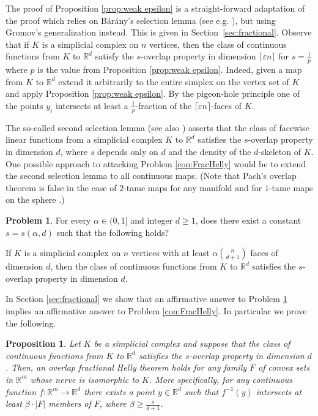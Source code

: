 \documentclass[12pt,a4paper,oneside]{amsart}\sloppy
\newtheorem{prop}[theorem]{Proposition}
\theoremstyle{definition}
\newtheorem{problem}[theorem]{Problem}
\begin{document}
The proof of Proposition \ref{prop:weak epsilon} is a straight-forward adaptation of the proof which relies on B{\'a}r{\'a}ny's selection lemma (see e.g. \cite[Theorem 9.2.1]{Matousek2002}), but using Gromov's generalization instead. This is given in Section~\ref{sec:fractional}. Observe that if $K$ is a simplicial complex on $n$ vertices, then the class of continuous functions from $K$ to $\mathbb{R}^d$ satisfy the $s$-overlap property in dimension $\lceil \varepsilon n \rceil$ for $s = \frac{1}{p}$ where $p$ is the value from Proposition \ref{prop:weak epsilon}. Indeed, given a map from $K$ to $\mathbb{R}^d$ extend it arbitrarily to the entire simplex on the vertex set of $K$ and apply Proposition \ref{prop:weak epsilon}. By the pigeon-hole principle one of the points $y_i$ intersects at least a $\frac{1}{p}$-fraction of the $\lceil \varepsilon n \rceil$-faces of $K$. 



The so-called second selection lemma \cite{bfl, abfk} (see also \cite[Theorem 9.2.1]{Matousek2002}) asserts that the class of facewise linear functions from a simplicial complex $K$ to $\mathbb{R}^d$ satisfies the $s$-overlap property in dimension $d$, where $s$ depends only on $d$ and the density of the $d$-skeleton of $K$. One possible approach to attacking Problem \ref{con:FracHelly} would be to extend the second selection lemma to all continuous maps. (Note that Pach's overlap theorem is false in the case of $2$-tame maps for any manifold and for $1$-tame maps on the sphere \cite{BaranyMeshulamNevoTancer2018, BukhHubard2020}.)

\begin{problem}\label{con:top2ndsel}
For every $\alpha\in (0,1]$ and integer $d\geq 1$, does there exist a constant $s = s(\alpha, d)$ such that the following holds? 

If $K$ is a simplicial complex on $n$ vertices with at least $\alpha \binom{n}{d+1}$ faces of dimension $d$, then the class of continuous functions from $K$ to $\mathbb{R}^d$ satisfies the $s$-overlap property in dimension $d$.
\end{problem}


In Section \ref{sec:fractional} we show that an affirmative answer to Problem \ref{con:top2ndsel} implies an affirmative answer to Problem \ref{con:FracHelly}. In particular we prove the following.

\begin{prop}\label{prop:2ndsel implies fractional}
Let $K$ be a simplicial complex and suppose that the class of continuous functions from $K$ to $\mathbb{R}^d$ satisfies the $s$-overlap property in dimension $d$. Then, an overlap fractional Helly theorem holds for any family $F$ of convex sets in $\mathbb{R}^m$ whose nerve is isomorphic to $K$. More specifically, for any continuous function $f: \mathbb{R}^m \to \mathbb{R}^d$ there exists a point $y\in \mathbb{R}^d$ such that $f^{-1}(y)$ intersects at least $\beta\cdot |F|$ members of $F$, where $\beta\geq \frac{s}{d+1}$.
\end{prop}
\end{document}
